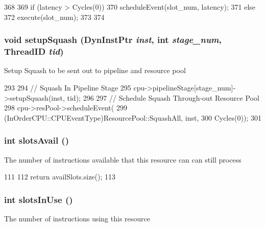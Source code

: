 \begin{DoxyCode}
368 {
369     if (latency > Cycles(0)) {
370         scheduleEvent(slot_num, latency);
371     } else {
372         execute(slot_num);
373     }
374 }
\end{DoxyCode}
\hypertarget{classResource_ab03920cf8ee0a1dd131d4a6db0320f71}{
\subsubsection[{setupSquash}]{\setlength{\rightskip}{0pt plus 5cm}void setupSquash ({\bf DynInstPtr} {\em inst}, \/  int {\em stage\_\-num}, \/  {\bf ThreadID} {\em tid})}}
\label{classResource_ab03920cf8ee0a1dd131d4a6db0320f71}
Setup Squash to be sent out to pipeline and resource pool 


\begin{DoxyCode}
293 {
294     // Squash In Pipeline Stage
295     cpu->pipelineStage[stage_num]->setupSquash(inst, tid);
296 
297     // Schedule Squash Through-out Resource Pool
298     cpu->resPool->scheduleEvent(
299         (InOrderCPU::CPUEventType)ResourcePool::SquashAll, inst,
300         Cycles(0));
301 }
\end{DoxyCode}
\hypertarget{classResource_aa376a7fab43ff33531fff37daaf97d30}{
\subsubsection[{slotsAvail}]{\setlength{\rightskip}{0pt plus 5cm}int slotsAvail ()}}
\label{classResource_aa376a7fab43ff33531fff37daaf97d30}
The number of instructions available that this resource can can still process 


\begin{DoxyCode}
111 {
112     return availSlots.size();
113 }
\end{DoxyCode}
\hypertarget{classResource_a7996fa2858e57c95ac52ee2813f816f7}{
\subsubsection[{slotsInUse}]{\setlength{\rightskip}{0pt plus 5cm}int slotsInUse ()}}
\label{classResource_a7996fa2858e57c95ac52ee2813f816f7}
The number of instructions using this resource 


